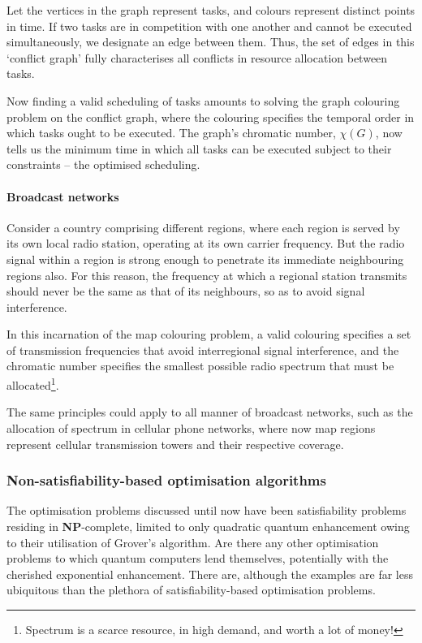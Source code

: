 Let the vertices in the graph represent tasks, and colours represent distinct points in time. If two tasks are in competition with one another and cannot be executed simultaneously, we designate an edge between them. Thus, the set of edges in this `conflict graph' fully characterises all conflicts in resource allocation between tasks.

Now finding a valid scheduling of tasks amounts to solving the graph colouring problem on the conflict graph, where the colouring specifies the temporal order in which tasks ought to be executed. The graph's chromatic number, $\chi(G)$, now tells us the minimum time in which all tasks can be executed subject to their constraints -- the optimised scheduling.

\paragraph{Broadcast networks}

Consider a country comprising different regions, where each region is served by its own local radio station, operating at its own carrier frequency. But the radio signal within a region is strong enough to penetrate its immediate neighbouring regions also. For this reason, the frequency at which a regional station transmits should never be the same as that of its neighbours, so as to avoid signal interference.

In this incarnation of the map colouring problem, a valid colouring specifies a set of transmission frequencies that avoid interregional signal interference, and the chromatic number specifies the smallest possible radio spectrum that must be allocated\footnote{Spectrum is a scarce resource, in high demand, and worth a lot of money!}.

The same principles could apply to all manner of broadcast networks, such as the allocation of spectrum in cellular phone networks, where now map regions represent cellular transmission towers and their respective coverage.

\subsubsection{Non-satisfiability-based optimisation algorithms}

The optimisation problems discussed until now have been satisfiability problems residing in \textbf{NP}-complete, limited to only quadratic quantum enhancement owing to their utilisation of Grover's algorithm. Are there any other optimisation problems to which quantum computers lend themselves, potentially with the cherished exponential enhancement. There are, although the examples are far less ubiquitous than the plethora of satisfiability-based optimisation problems.

